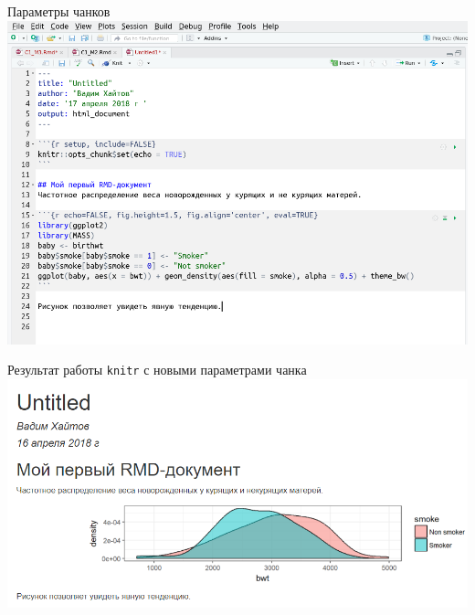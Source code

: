 \documentclass[
  10pt,
  ignorenonframetext,
  aspectratio=169,t,xcolor=table]{beamer}
\begin{document}
\begin{frame}{Параметры чанков}
\protect\hypertarget{ux43fux430ux440ux430ux43cux435ux442ux440ux44b-ux447ux430ux43dux43aux43eux432}{}
\includegraphics[height=0.7\textheight,keepaspectratio]{./images/RMD_chunk_parameters_Ira.png}
\end{frame}

\begin{frame}{Результат работы \texttt{knitr} с новыми параметрами
чанка}
\protect\hypertarget{ux440ux435ux437ux443ux43bux44cux442ux430ux442-ux440ux430ux431ux43eux442ux44b-knitr-ux441-ux43dux43eux432ux44bux43cux438-ux43fux430ux440ux430ux43cux435ux442ux440ux430ux43cux438-ux447ux430ux43dux43aux430}{}
\includegraphics[height=0.7\textheight,keepaspectratio]{./images/RMD_browser_view_2.png}
\end{frame}
\end{document}
